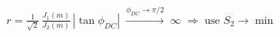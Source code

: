 \documentclass[border=1pt]{standalone}
\begin{document}
\fontsize{14}{16.8}\selectfont
\(\displaystyle r = \frac{1}{\sqrt{2}}\,\frac{J_1(m)}{J_2(m)}\,|\tan\phi_{DC}|\;\xrightarrow{\phi_{DC}\to\pi/2}\;\infty\;\Longrightarrow\;\text{use }S_2\to\min\)
\end{document}
